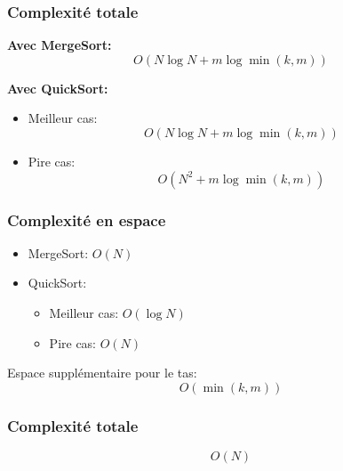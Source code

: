 \subsubsection{Complexité totale}

\textbf{Avec MergeSort:}
\[
O(N \log N + m \log \min(k, m))
\]

\textbf{Avec QuickSort:}
\begin{itemize}
    \item Meilleur cas:
    \[
    O(N \log N + m \log \min(k, m))
    \]
    \item Pire cas:
    \[
    O(N^2 +m \log \min(k, m))
    \]
\end{itemize}

\subsubsection{Complexité en espace}
\begin{itemize}
    \item MergeSort: $O(N)$
    \item QuickSort:
    \begin{itemize}
        \item Meilleur cas: $O(\log N)$
        \item Pire cas: $O(N)$
    \end{itemize}
\end{itemize}

Espace supplémentaire pour le tas:
\[
O(\min(k, m))
\]

\subsubsection{Complexité totale}
\[
O(N)
\]
